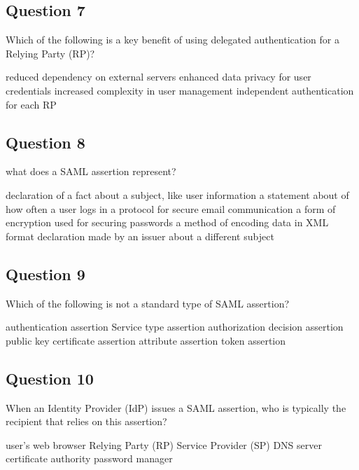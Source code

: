 \subsection*{Question 7}
Which of the following is a key benefit of using delegated authentication for a Relying Party (RP)?
\begin{itemize}
  \incorrect  reduced dependency on external servers 
  \correct  enhanced data privacy for user credentials 
  \incorrect  increased complexity in user management 
  \incorrect  independent authentication for each RP
\end{itemize}

\subsection*{Question 8}
what does a SAML assertion represent?
\begin{itemize}
  \correct  declaration of a fact about a subject, like user information
  \incorrect  a statement about of how often a user logs in
  \incorrect  a protocol for secure email communication
  \incorrect  a form of encryption used for securing passwords
  \incorrect  a method of encoding data in XML format
  \correct  declaration made by an issuer about a different subject
\end{itemize}

\subsection*{Question 9}
Which of the following is not a standard type of SAML assertion?
\begin{itemize}
  \incorrect  authentication assertion
  \correct  Service type assertion
  \incorrect  authorization decision assertion 
  \correct  public key certificate assertion 
  \incorrect  attribute assertion
  \correct  token assertion
\end{itemize}

\subsection*{Question 10}
When an Identity Provider (IdP) issues a SAML assertion, who is
typically the recipient that relies on this assertion?
\begin{itemize}
  \incorrect user's web browser
  \correct Relying Party (RP)
  \correct Service Provider (SP)
  \incorrect DNS server
  \incorrect certificate authority 
  \incorrect password manager
\end{itemize}

